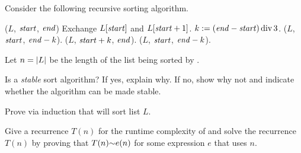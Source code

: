 \begin{problem}
Consider the following recursive sorting algorithm.
\begin{myalgo}{($L$, $\textit{start\/}$, $\textit{end\/}$)}
            \STATE Exchange $L[\textit{start\/}]$ and $L[\textit{start\/} + 1]$.
        \ENDIF
        \STATE $k := (\textit{end\/} - \textit{start\/}) \operatorname{div} 3$.
        \STATE {}($L$, $\textit{start\/}$, $\textit{end\/} - k$).
        \STATE {}($L$, $\textit{start\/} + k$, $\textit{end\/}$).
        \STATE {}($L$, $\textit{start\/}$, $\textit{end\/} - k$).
    \ENDIF
\end{myalgo}
Let $n = \lvert L \rvert$ be the length of the list being sorted by .

\begin{questions}
\item Is  a \emph{stable} sort algorithm? If yes, explain why. If no, show why not and indicate whether the algorithm can be made stable.
\item Prove via induction that  will sort list $L$.
\item Give a recurrence $T(n)$ for the runtime complexity of  and solve the recurrence $T(n)$ by proving that $T(n) \mathord{\sim}e(n)$ for some expression $e$ that uses $n$.
\end{questions}
\end{problem}

